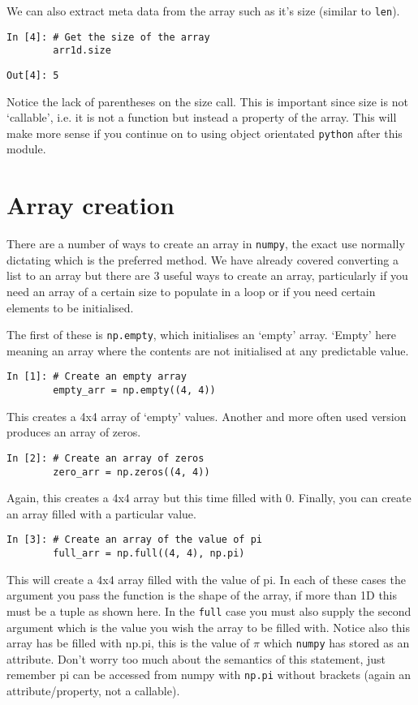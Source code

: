 We can also extract meta data from the array such as it's size (similar to \texttt{len}).
\begin{lstlisting}[style=PY]
In [4]: # Get the size of the array
        arr1d.size
\end{lstlisting}
\begin{lstlisting}[style=PY, backgroundcolor=\color{white}]
Out[4]: 5
\end{lstlisting}
Notice the lack of parentheses on the size call. This is important since size is not `callable', i.e. it is not a function but instead a property of the array. This will make more sense if you continue on to using object orientated \texttt{python} after this module.

\section{Array creation}

There are a number of ways to create an array in \texttt{numpy}, the exact use normally dictating which is the preferred method. We have already covered converting a list to an array but there are 3 useful ways to create an array, particularly if you need an array of a certain size to populate in a loop or if you need certain elements to be initialised.

The first of these is \texttt{np.empty}, which initialises an `empty' array. `Empty' here meaning an array where the contents are not initialised at any predictable value. 

\begin{lstlisting}[style=PY]
In [1]: # Create an empty array
        empty_arr = np.empty((4, 4))
\end{lstlisting}
This creates a 4x4 array of `empty' values. Another and more often used version produces an array of zeros.
\begin{lstlisting}[style=PY]
In [2]: # Create an array of zeros
        zero_arr = np.zeros((4, 4))
\end{lstlisting}
Again, this creates a 4x4 array but this time filled with 0. Finally, you can create an array filled with a particular value.
\begin{lstlisting}[style=PY]
In [3]: # Create an array of the value of pi
        full_arr = np.full((4, 4), np.pi)
\end{lstlisting}
This will create a 4x4 array filled with the value of pi. In each of these cases the argument you pass the function is the shape of the array, if more than 1D this must be a tuple as shown here. In the \texttt{full} case you must also supply the second argument which is the value you wish the array to be filled with. Notice also this array has be filled with np.pi, this is the value of $\pi$ which \texttt{numpy} has stored as an attribute. Don't worry too much about the semantics of this statement, just remember pi can be accessed from numpy with \texttt{np.pi} without brackets (again an attribute/property, not a callable).

